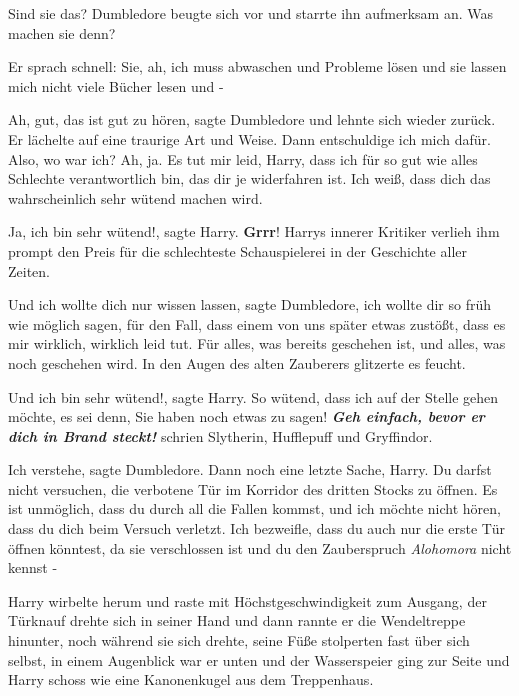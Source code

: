 \glqq{}Sind sie das?\grqq{} Dumbledore beugte sich vor und starrte ihn aufmerksam
an. \glqq{}Was machen sie denn?\grqq{}

Er sprach schnell: \glqq{}Sie, ah, ich muss abwaschen und Probleme lösen und sie
lassen mich nicht viele Bücher lesen und -\grqq{}

\glqq{}Ah, gut, das ist gut zu hören\grqq{}, sagte Dumbledore und lehnte sich
wieder zurück. Er lächelte auf eine traurige Art und Weise. \glqq{}Dann
entschuldige ich mich dafür. Also, wo war ich? Ah, ja. Es tut mir leid, Harry,
dass ich für so gut wie alles Schlechte verantwortlich bin, das dir je
widerfahren ist. Ich weiß, dass dich das wahrscheinlich sehr wütend machen
wird.\grqq{}

\glqq{}Ja, ich bin sehr wütend!\grqq{}, sagte Harry. \glqq{}\textbf{Grrr}!\grqq{}
Harrys innerer Kritiker verlieh ihm prompt den Preis für die schlechteste
Schauspielerei in der Geschichte aller Zeiten.

\glqq{}Und ich wollte dich nur wissen lassen\grqq{}, sagte Dumbledore, \glqq{}ich
wollte dir so früh wie möglich sagen, für den Fall, dass einem von uns später
etwas zustößt, dass es mir wirklich, wirklich leid tut. Für alles, was bereits
geschehen ist, und alles, was noch geschehen wird.\grqq{} In den Augen des alten
Zauberers glitzerte es feucht.

\glqq{}Und ich bin sehr wütend!\grqq{}, sagte Harry. \glqq{}So wütend, dass ich
auf der Stelle gehen möchte, es sei denn, Sie haben noch etwas zu sagen!\grqq{}
\textbf{\emph{Geh einfach, bevor er dich in Brand steckt!}} schrien Slytherin,
Hufflepuff und Gryffindor.

\glqq{}Ich verstehe\grqq{}, sagte Dumbledore. \glqq{}Dann noch eine letzte Sache,
Harry. Du darfst nicht versuchen, die verbotene Tür im Korridor des dritten
Stocks zu öffnen. Es ist unmöglich, dass du durch all die Fallen kommst, und ich
möchte nicht hören, dass du dich beim Versuch verletzt. Ich bezweifle, dass du
auch nur die erste Tür öffnen könntest, da sie verschlossen ist und du den
Zauberspruch \emph{Alohomora} nicht kennst -\grqq{}

Harry wirbelte herum und raste mit Höchstgeschwindigkeit zum Ausgang, der
Türknauf drehte sich in seiner Hand und dann rannte er die Wendeltreppe
hinunter, noch während sie sich drehte, seine Füße stolperten fast über sich
selbst, in einem Augenblick war er unten und der Wasserspeier ging zur Seite und
Harry schoss wie eine Kanonenkugel aus dem Treppenhaus.

